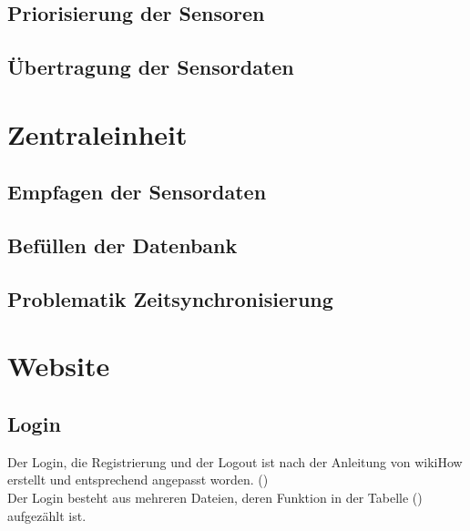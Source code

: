 \subsection{Priorisierung der Sensoren}
\subsection{Übertragung der Sensordaten}

\section{Zentraleinheit}%
\subsection{Empfagen der Sensordaten}
\subsection{Befüllen der Datenbank}
\subsection{Problematik Zeitsynchronisierung}
 
\section{Website}

\subsection{Login}

Der Login, die Registrierung und der Logout ist nach der Anleitung von
wikiHow erstellt und entsprechend angepasst worden. (\cite{PHP-Login})
\\
Der Login besteht aus mehreren Dateien, deren Funktion in der Tabelle
() aufgezählt ist.

